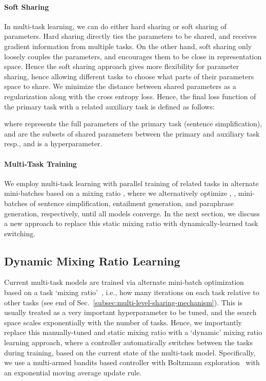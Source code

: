 \documentclass[11pt]{article}
\begin{document}
\paragraph{Soft Sharing}
In multi-task learning, we can do either hard sharing or soft sharing of parameters. Hard sharing directly ties the parameters to be shared, and receives gradient information from multiple tasks. On the other hand, soft sharing only loosely couples the parameters, and encourages them to be close in representation space. Hence the soft sharing approach gives more flexibility for parameter sharing, hence allowing different tasks to choose what parts of their parameters space to share. We minimize the  distance between shared parameters as a regularization along with the cross entropy loss. Hence, the final loss function of the primary task with a related auxiliary task is defined as follows:
\vspace{-6pt}

where  represents the full parameters of the primary task (sentence simplification),  and  are the subsets of shared parameters between the primary and auxiliary task resp., and  is a hyperparameter.

\paragraph{Multi-Task Training}
We employ multi-task learning with parallel training of related tasks in alternate mini-batches based on a mixing ratio , where we alternatively optimize , ,  mini-batches of sentence simplification, entailment generation, and paraphrase generation, respectively, until all models converge. In the next section, we discuss a new approach to replace this static mixing ratio with dynamically-learned task switching.

\subsection{Dynamic Mixing Ratio Learning}
\label{subsec:active-sampling}
Current multi-task models are trained via alternate mini-batch optimization based on a task `mixing ratio'~\cite{luong2015multi,pasunuru2017multitask}, i.e., how many iterations on each task relative to other tasks (see end of Sec.~\ref{subsec:multi-level-sharing-mechanism}). This is usually treated as a very important hyperparameter to be tuned, and the search space scales exponentially with the number of tasks. Hence, we importantly replace this manually-tuned and static mixing ratio with a `dynamic' mixing ratio learning approach, where a controller automatically switches between the tasks during training, based on the current state of the multi-task model. Specifically, we use a multi-armed bandits based controller with Boltzmann exploration~\cite{kaelbling1996reinforcement} with an exponential moving average update rule. 
\end{document}
